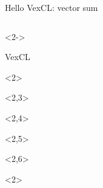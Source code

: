 \documentclass[@BEAMER_OPTIONS@]{beamer}
\begin{document}
\begin{frame}[fragile]{Hello VexCL: vector sum}
\begin{columns}
        \begin{column}[t]{0.7\textwidth}
            \begin{onlyenv}<2->
            \begin{exampleblock}{VexCL}
                \begin{adjustbox}{width=0.83\textwidth, height=\textheight, keepaspectratio}
                    \begin{minipage}{\textwidth}
                        \begin{uncoverenv}<2>
                            
                        \end{uncoverenv}
                        \begin{uncoverenv}<2,3>
                            
                        \end{uncoverenv}
                        \begin{uncoverenv}<2,4>
                            
                        \end{uncoverenv}
                        \begin{uncoverenv}<2,5>
                            
                        \end{uncoverenv}
                        \begin{uncoverenv}<2,6>
                            
                        \end{uncoverenv}
                        \begin{uncoverenv}<2>
                            
                        \end{uncoverenv}
                    \end{minipage}
                \end{adjustbox}
            \end{exampleblock}
            \end{onlyenv}
        \end{column}
    \end{columns}
\end{frame}
\end{document}
